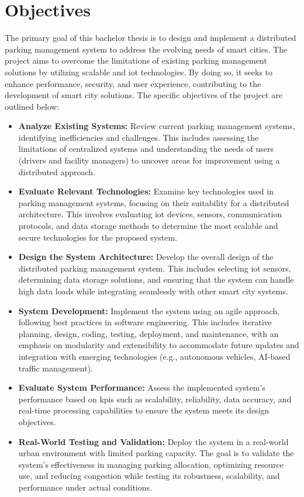 
\chapter{Objectives}\label{ch:objectives}

The primary goal of this bachelor thesis is to design and implement a distributed parking management system to address the evolving needs of smart cities. The project aims to overcome the limitations of existing parking management solutions by utilizing scalable and \gls{iot} technologies. By doing so, it seeks to enhance performance, security, and user experience, contributing to the development of smart city solutions. The specific objectives of the project are outlined below:

\begin{itemize}
	\item \textbf{Analyze Existing Systems:} Review current parking management systems, identifying inefficiencies and challenges. This includes assessing the limitations of centralized systems and understanding the needs of users (drivers and facility managers) to uncover areas for improvement using a distributed approach.

	\item \textbf{Evaluate Relevant Technologies:} Examine key technologies used in parking management systems, focusing on their suitability for a distributed architecture. This involves evaluating \gls{iot} devices, sensors, communication protocols, and data storage methods to determine the most scalable and secure technologies for the proposed system.

	\item \textbf{Design the System Architecture:} Develop the overall design of the distributed parking management system. This includes selecting \gls{iot} sensors, determining data storage solutions, and ensuring that the system can handle high data loads while integrating seamlessly with other smart city systems.

	\item \textbf{System Development:} Implement the system using an agile approach, following best practices in software engineering. This includes iterative planning, design, coding, testing, deployment, and maintenance, with an emphasis on modularity and extensibility to accommodate future updates and integration with emerging technologies (e.g., autonomous vehicles, AI-based traffic management).

	\item \textbf{Evaluate System Performance:} Assess the implemented system's performance based on \glspl{kpi} such as scalability, reliability, data accuracy, and real-time processing capabilities to ensure the system meets its design objectives.

	\item \textbf{Real-World Testing and Validation:} Deploy the system in a real-world urban environment with limited parking capacity. The goal is to validate the system’s effectiveness in managing parking allocation, optimizing resource use, and reducing congestion while testing its robustness, scalability, and performance under actual conditions.

\end{itemize}

